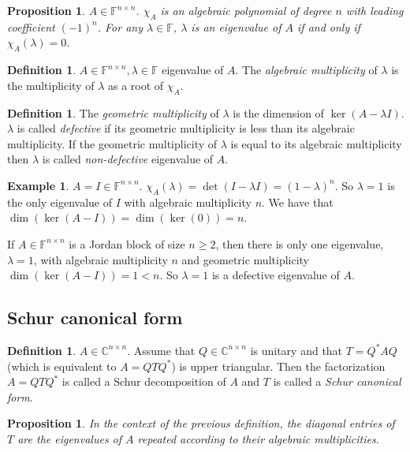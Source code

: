 \documentclass[12pt]{article}
\newtheorem{proposition}[theorem]{Proposition}
\theoremstyle{definition}
\newtheorem{definition}[theorem]{Definition}
\newtheorem*{example*}{Example}
\theoremstyle{remark}
\numberwithin{equation}{section}
\newcommand{\F}{\mathbb{F}}
\newcommand{\C}{\mathbb{C}}
\begin{document}
\begin{proposition}
  \label{prop:charpoly-eigenvalues}
  $A \in \F^{n \times n}$. $\chi_A$ is an algebraic polynomial of degree $n$ with leading coefficient $(-1)^n$. For any $\lambda \in \F$, $\lambda$ is an eigenvalue of $A$ if and only if $\chi_A(\lambda) = 0$.
\end{proposition}
\begin{definition}
  \label{def:alg-mult}
  $A \in \F^{n \times n}, \lambda \in \F$ eigenvalue of $A$. The \emph{algebraic multiplicity} of $\lambda$ is the multiplicity of $\lambda$ as a root of $\chi_A$.
\end{definition}
\begin{definition}
  \label{def:geom-mult}
  The \emph{geometric multiplicity} of $\lambda$ is the dimension of $\ker(A - \lambda I)$. $\lambda$ is called \emph{defective} if its geometric multiplicity is less than its algebraic multiplicity. If the geometric multiplicity of $\lambda$ is equal to its algebraic multiplicity then $\lambda$ is called \emph{non-defective} eigenvalue of $A$.
\end{definition}

\begin{example*}
  $A = I \in \F^{n \times n}$. $\chi_A(\lambda) = \det(I - \lambda I) = (1-\lambda)^n$. So $\lambda=1$ is the only eigenvalue of $I$ with algebraic multiplicity $n$. We have that $\dim (\ker (A-I)) =  \dim( \ker (0)) = n$.

  If $A \in \F^{n \times n}$ is a Jordan block of size $n \geq 2$, then there is only one eigenvalue, $\lambda=1$, with algebraic multiplicity $n$ and geometric multiplicity $\dim(\ker(A-I)) = 1<n$. So $\lambda=1$ is a defective eigenvalue of $A$.
\end{example*}

\subsection{Schur canonical form}
\begin{definition}
  $A\in \C^{n\times n}$. Assume that $Q \in \C^{n\times n}$ is unitary and that $T= Q^*AQ$ (which is equivalent to $A = QTQ^*$) is upper triangular. Then the factorization $A = QTQ^*$ is called a Schur decomposition of $A$ and $T$ is called a \emph{Schur canonical form}.
\end{definition}

\begin{proposition}
  In the context of the previous definition, the diagonal entries of $T$ are the eigenvalues of $A$ repeated according to their algebraic multiplicities.
\end{proposition}
\end{document}
